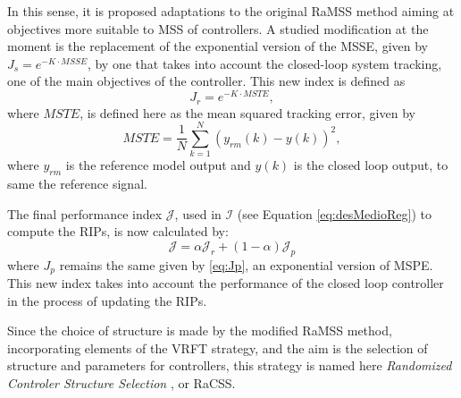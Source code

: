 In this sense, it is proposed adaptations to the original RaMSS method aiming at objectives more suitable to MSS of controllers. A studied modification at the moment is the replacement of the exponential version of the MSSE, given by $J_s= e^{-K\cdot MSSE}$, by one that takes into account the closed-loop system tracking, one of the main objectives of the controller. This new index is defined as
\begin{equation}
  J_r=e^{-K\cdot MSTE},
  \label{eq:Jr}
\end{equation}
where $MSTE$, is defined here as the mean squared tracking error, given by
\begin{equation}
  MSTE = \frac{1}{N}\sum_{k=1}^{N} (y_{rm}(k)-y(k))^2,
  \label{eq:MSTE}
\end{equation} 
where $y_{rm}$ is the reference model output and $y(k)$ is the closed loop output, to same the reference signal.

The final performance index $\mathcal{J}$, used in $\mathcal{I}$ (see Equation \ref{eq:desMedioReg}) to compute the RIPs, is now calculated by:
\begin{equation}
  \mathcal{J} = \alpha \mathcal{J}_r + (1-\alpha)\mathcal{J}_p
\label{eq:Jracss}
\end{equation}
where $J_p$ remains the same given by \eqref{eq:Jp}, an exponential version of MSPE. This new index takes into account the performance of the closed loop controller in the process of updating the RIPs.

Since the choice of structure is made by the modified RaMSS method, incorporating elements of the VRFT strategy, and the aim is the selection of structure and parameters for controllers, this strategy is named here \textit{Randomized Controler Structure Selection }, or RaCSS.


